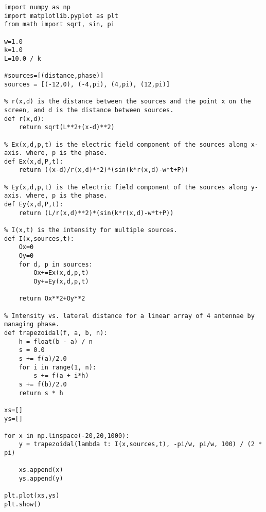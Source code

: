 \begin{Verbatim}[fontsize=\small,baselinestretch=0.9]
import numpy as np
import matplotlib.pyplot as plt
from math import sqrt, sin, pi

w=1.0
k=1.0
L=10.0 / k

#sources=[(distance,phase)]
sources = [(-12,0), (-4,pi), (4,pi), (12,pi)]

% r(x,d) is the distance between the sources and the point x on the screen, and d is the distance between sources.
def r(x,d):
    return sqrt(L**2+(x-d)**2)
    
% Ex(x,d,p,t) is the electric field component of the sources along x-axis. where, p is the phase.
def Ex(x,d,P,t):
    return ((x-d)/r(x,d)**2)*(sin(k*r(x,d)-w*t+P))
   
% Ey(x,d,p,t) is the electric field component of the sources along y-axis. where, p is the phase.
def Ey(x,d,P,t):
    return (L/r(x,d)**2)*(sin(k*r(x,d)-w*t+P))
 
% I(x,t) is the intensity for multiple sources.
def I(x,sources,t):
    Ox=0
    Oy=0
    for d, p in sources:
        Ox+=Ex(x,d,p,t)
        Oy+=Ey(x,d,p,t)
    
    return Ox**2+Oy**2
        
% Intensity vs. lateral distance for a linear array of 4 antennae by managing phase.
def trapezoidal(f, a, b, n):
    h = float(b - a) / n
    s = 0.0
    s += f(a)/2.0
    for i in range(1, n):
        s += f(a + i*h)
    s += f(b)/2.0
    return s * h

xs=[]
ys=[]

for x in np.linspace(-20,20,1000):
    y = trapezoidal(lambda t: I(x,sources,t), -pi/w, pi/w, 100) / (2 * pi)
   
    xs.append(x)
    ys.append(y)

plt.plot(xs,ys)
plt.show()
\end{Verbatim}

